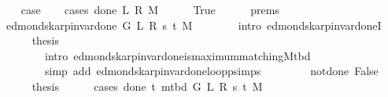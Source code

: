 \begin{isabellebody}
\ \ \isamarkupfalse%
\ {\isacharquery}{\kern0pt}case\isanewline
\ \ \isamarkupfalse%
\ {\isacharparenleft}{\kern0pt}cases\ {\isachardoublequoteopen}done{\isacharunderscore}{\kern0pt}{}\ L\ R\ M{\isachardoublequoteclose}{\isacharparenright}{\kern0pt}\isanewline
\ \ \ \ \isamarkupfalse%
\ True\isanewline
\ \ \ \ \isamarkupfalse%
\ {\isachardoublequoteopen}{}{\isachardot}{\kern0pt}prems{\isachardoublequoteclose}\isanewline
\ \ \ \ \isamarkupfalse%
\ {\isachardoublequoteopen}edmonds{\isacharunderscore}{\kern0pt}karp{\isacharunderscore}{\kern0pt}invar{\isacharunderscore}{\kern0pt}done{\isacharunderscore}{\kern0pt}{}{\isacharprime}{\kern0pt}\ G\ L\ R\ s\ t\ M{\isachardoublequoteclose}\isanewline
\ \ \ \ \ \ \isamarkupfalse%
\ {\isacharparenleft}{\kern0pt}intro\ edmonds{\isacharunderscore}{\kern0pt}karp{\isacharunderscore}{\kern0pt}invar{\isacharunderscore}{\kern0pt}done{\isacharunderscore}{\kern0pt}{}I{\isacharparenright}{\kern0pt}\isanewline
\ \ \ \ \isamarkupfalse%
\ {\isacharquery}{\kern0pt}thesis\isanewline
\ \ \ \ \ \ \isamarkupfalse%
\isanewline
\ \ \ \ \ \ \ \ {\isacharparenleft}{\kern0pt}intro\ edmonds{\isacharunderscore}{\kern0pt}karp{\isacharunderscore}{\kern0pt}invar{\isacharunderscore}{\kern0pt}done{\isacharunderscore}{\kern0pt}{}{\isachardot}{\kern0pt}is{\isacharunderscore}{\kern0pt}maximum{\isacharunderscore}{\kern0pt}matching{\isacharunderscore}{\kern0pt}M{\isacharunderscore}{\kern0pt}tbd{\isacharparenright}{\kern0pt}\isanewline
\ \ \ \ \ \ \ \ {\isacharparenleft}{\kern0pt}simp\ add{\isacharcolon}{\kern0pt}\ edmonds{\isacharunderscore}{\kern0pt}karp{\isacharunderscore}{\kern0pt}invar{\isacharunderscore}{\kern0pt}done{\isacharunderscore}{\kern0pt}{}{\isachardot}{\kern0pt}loop{\isacharprime}{\kern0pt}{\isacharunderscore}{\kern0pt}psimps{\isacharparenright}{\kern0pt}\isanewline
\ \ \isamarkupfalse%
\isanewline
\ \ \ \ \isamarkupfalse%
\ not{\isacharunderscore}{\kern0pt}done{\isacharunderscore}{\kern0pt}{}{\isacharcolon}{\kern0pt}\ False\isanewline
\ \ \ \ \isamarkupfalse%
\ {\isacharquery}{\kern0pt}thesis\isanewline
\ \ \ \ \isamarkupfalse%
\ {\isacharparenleft}{\kern0pt}cases\ {\isachardoublequoteopen}done{\isacharunderscore}{\kern0pt}{}\ t\ {\isacharparenleft}{\kern0pt}m{\isacharunderscore}{\kern0pt}tbd\ G\ L\ R\ s\ t\ M{\isacharparenright}{\kern0pt}{\isachardoublequoteclose}{\isacharparenright}{\kern0pt}\isanewline

\end{isabellebody}
